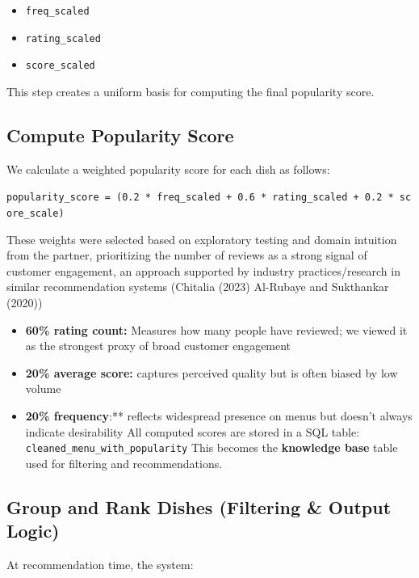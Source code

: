 \documentclass[
  11pt,
  a4paper,
  DIV=11,
  numbers=noendperiod]{scrartcl}
\providecommand{\tightlist}{%
  \setlength{\itemsep}{0pt}\setlength{\parskip}{0pt}}\usepackage{longtable,booktabs,array}
\begin{document}
\begin{itemize}
\tightlist
\item
  \texttt{freq\_scaled}
\item
  \texttt{rating\_scaled}
\item
  \texttt{score\_scaled}
\end{itemize}

This step creates a uniform basis for computing the final popularity
score.

\subsection{Compute Popularity Score}\label{compute-popularity-score}

We calculate a weighted popularity score for each dish as follows:

\texttt{popularity\_score\ =\ (0.2\ *\ freq\_scaled\ +\ 0.6\ *\ rating\_scaled\ +\ 0.2\ *\ score\_scale)}

These weights were selected based on exploratory testing and domain
intuition from the partner, prioritizing the number of reviews as a
strong signal of customer engagement, an approach supported by industry
practices/research in similar recommendation systems (Chitalia (2023)
Al-Rubaye and Sukthankar (2020))

\begin{itemize}
\tightlist
\item
  \textbf{60\% rating count:} Measures how many people have reviewed; we
  viewed it as the strongest proxy of broad customer engagement
\item
  \textbf{20\% average score:} captures perceived quality but is often
  biased by low volume
\item
  \textbf{20\% frequency}:** reflects widespread presence on menus but
  doesn't always indicate desirability All computed scores are stored in
  a SQL table: \texttt{cleaned\_menu\_with\_popularity} This becomes the
  \textbf{knowledge base} table used for filtering and recommendations.
\end{itemize}

\subsection{Group and Rank Dishes (Filtering \& Output
Logic)}\label{group-and-rank-dishes-filtering-output-logic}

At recommendation time, the system:
\end{document}
